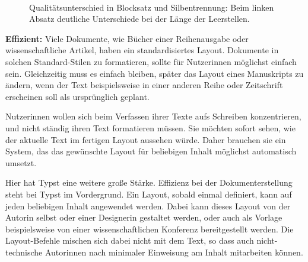 \documentclass[11pt, a4paper]{article}
\newcommand{\gender}{\raisebox{-.25em}{*}}
\begin{document}
\begin{figure}
    \centering
    ~ %
    \caption{Qualitätsunterschied in Blocksatz und Silbentrennung: 
  Beim linken Absatz deutliche Unterschiede bei der Länge der Leerstellen.}
\end{figure}

\textbf{Effizient:} Viele Dokumente, wie Bücher einer Reihenausgabe oder wissenschaftliche Artikel, haben ein standardisiertes Layout. Dokumente in solchen Standard-Stilen zu formatieren, sollte für Nutzer\gender{}innen möglichst einfach sein. Gleichzeitig muss es einfach bleiben, später das Layout eines Manuskripts zu ändern, wenn der Text beispielsweise in einer anderen Reihe oder Zeitschrift erscheinen soll als ursprünglich geplant.

Nutzer\gender{}innen wollen sich beim Verfassen ihrer Texte aufs Schreiben konzentrieren, und nicht  ständig ihren Text formatieren müssen. Sie möchten sofort sehen, wie der aktuelle Text im fertigen Layout aussehen würde. Daher brauchen sie ein System, das das gewünschte Layout für beliebigen Inhalt möglichst automatisch umsetzt.

Hier hat Typst eine weitere große Stärke. Effizienz bei der Dokumenterstellung steht bei Typst im Vordergrund. Ein Layout, sobald einmal definiert, kann auf jeden beliebigen Inhalt angewendet werden. Dabei kann dieses Layout von der\gender{} Autor\gender{}in selbst oder einer\gender{} Designer\gender{}in gestaltet werden, oder auch als Vorlage beispielsweise von einer wissenschaftlichen Konferenz bereitgestellt werden. Die Layout-Befehle mischen sich dabei nicht mit dem Text, so dass auch nicht-technische Autor\gender{}innen nach minimaler Einweisung am Inhalt mitarbeiten können.
\end{document}
